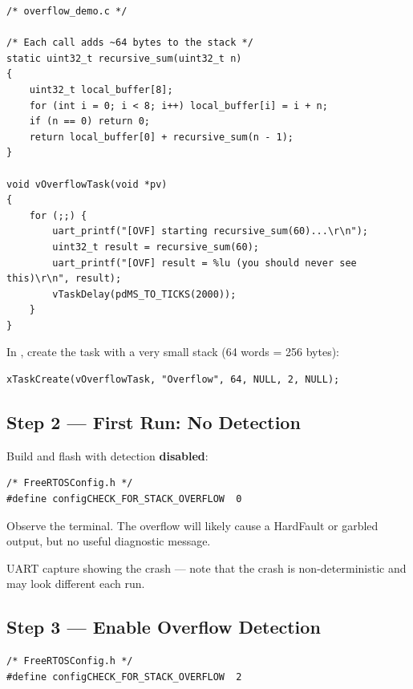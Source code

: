 \documentclass[11pt, a4paper]{article}
\begin{document}
\begin{lstlisting}[style=cstyle]
/* overflow_demo.c */

/* Each call adds ~64 bytes to the stack */
static uint32_t recursive_sum(uint32_t n)
{
    uint32_t local_buffer[8];
    for (int i = 0; i < 8; i++) local_buffer[i] = i + n;
    if (n == 0) return 0;
    return local_buffer[0] + recursive_sum(n - 1);
}

void vOverflowTask(void *pv)
{
    for (;;) {
        uart_printf("[OVF] starting recursive_sum(60)...\r\n");
        uint32_t result = recursive_sum(60);
        uart_printf("[OVF] result = %lu (you should never see this)\r\n", result);
        vTaskDelay(pdMS_TO_TICKS(2000));
    }
}
\end{lstlisting}

In , create the task with a very small stack (64 words = 256 bytes):

\begin{lstlisting}[style=cstyle]
xTaskCreate(vOverflowTask, "Overflow", 64, NULL, 2, NULL);
\end{lstlisting}

\subsection{Step 2 --- First Run: No Detection}

Build and flash with detection \textbf{disabled}:

\begin{lstlisting}[style=cstyle]
/* FreeRTOSConfig.h */
#define configCHECK_FOR_STACK_OVERFLOW  0
\end{lstlisting}

Observe the terminal. The overflow will likely cause a HardFault or garbled output, but
no useful diagnostic message.

\begin{checkpointbox}[~A1]
  UART capture showing the crash --- note that the crash is non-deterministic and may
  look different each run.
\end{checkpointbox}

\subsection{Step 3 --- Enable Overflow Detection}

\begin{lstlisting}[style=cstyle]
/* FreeRTOSConfig.h */
#define configCHECK_FOR_STACK_OVERFLOW  2
\end{lstlisting}
\end{document}
